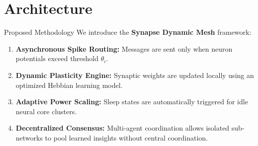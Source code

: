 \section{Architecture}

\begin{frame}{Proposed Methodology}
  We introduce the \textbf{Synapse Dynamic Mesh} framework:
  \begin{enumerate}
    \item \textbf{Asynchronous Spike Routing:} Messages are sent only when neuron potentials exceed threshold $\theta_i$.
    \item \textbf{Dynamic Plasticity Engine:} Synaptic weights are updated locally using an optimized Hebbian learning model.
    \item \textbf{Adaptive Power Scaling:} Sleep states are automatically triggered for idle neural core clusters.
    \item \textbf{Decentralized Consensus:} Multi-agent coordination allows isolated sub-networks to pool learned insights without central coordination.
  \end{enumerate}
\end{frame}

